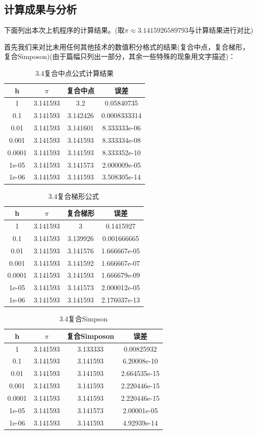 \documentclass{ctexart}
\begin{document}
\subsection{计算成果与分析}
下面列出本次上机程序的计算结果。(取$\pi\approx3.1415926589793$与计算结果进行对比)

首先我们来对比未用任何其他技术的数值积分格式的结果(复合中点，复合梯形，复合Simposon)(由于篇幅只列出一部分，其余一些特殊的现象用文字描述)：
\begin{center}
\begin{longtable}{|c|c|cc|}
\caption{3.4复合中点公式计算结果}\\
\hline
h& $\pi$& 复合中点& 误差\\
\hline
1& 3.141593& 3.2& 0.05840735\\
\hline
0.1& 3.141593& 3.142426& 0.0008333314\\
\hline
0.01& 3.141593& 3.141601& 8.333333e-06\\
\hline
0.001& 3.141593& 3.141593& 8.333334e-08\\
\hline
0.0001& 3.141593& 3.141593& 8.333352e-10\\
\hline
1e-05& 3.141593& 3.141573& 2.000009e-05\\
\hline
1e-06& 3.141593& 3.141593& 3.508305e-14\\
\hline
\end{longtable}
\begin{longtable}{|c|c|cc|}
\caption{3.4复合梯形公式}\\
\hline
h& $\pi$& 复合梯形& 误差\\
\hline
1& 3.141593& 3& 0.1415927\\
\hline
0.1& 3.141593& 3.139926& 0.001666665\\
\hline
0.01& 3.141593& 3.141576& 1.666667e-05\\
\hline
0.001& 3.141593& 3.141592& 1.666667e-07\\
\hline
0.0001& 3.141593& 3.141593& 1.666679e-09\\
\hline
1e-05& 3.141593& 3.141573& 2.000012e-05\\
\hline
1e-06& 3.141593& 3.141593& 2.176037e-13\\
\hline
\end{longtable}
\begin{longtable}{|c|c|cc|}
\caption{3.4复合Simpson}\\
\hline
h& $\pi$& 复合Simposon& 误差\\
\hline
1& 3.141593& 3.133333& 0.00825932\\
\hline
0.1& 3.141593& 3.141593& 6.20008e-10\\
\hline
0.01& 3.141593& 3.141593& 2.664535e-15\\
\hline
0.001& 3.141593& 3.141593& 2.220446e-15\\
\hline
0.0001& 3.141593& 3.141593& 2.220446e-15\\
\hline
1e-05& 3.141593& 3.141573& 2.00001e-05\\
\hline
1e-06& 3.141593& 3.141593& 4.92939e-14\\
\hline
\end{longtable}
\end{center}
\end{document}
